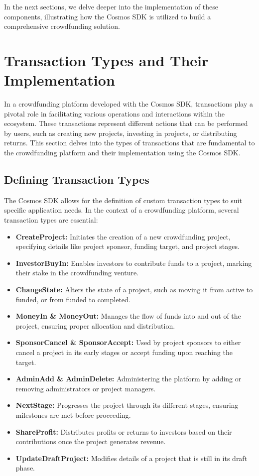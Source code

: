 In the next sections, we delve deeper into the implementation of these components, illustrating how the Cosmos SDK is utilized to build a comprehensive crowdfunding solution.

\section{Transaction Types and Their Implementation}

In a crowdfunding platform developed with the Cosmos SDK, transactions play a pivotal role in facilitating various operations and interactions within the ecosystem. These transactions represent different actions that can be performed by users, such as creating new projects, investing in projects, or distributing returns. This section delves into the types of transactions that are fundamental to the crowdfunding platform and their implementation using the Cosmos SDK.

\subsection{Defining Transaction Types}

The Cosmos SDK allows for the definition of custom transaction types to suit specific application needs. In the context of a crowdfunding platform, several transaction types are essential:

\begin{itemize}
    \item \textbf{CreateProject:} Initiates the creation of a new crowdfunding project, specifying details like project sponsor, funding target, and project stages.
    \item \textbf{InvestorBuyIn:} Enables investors to contribute funds to a project, marking their stake in the crowdfunding venture.
    \item \textbf{ChangeState:} Alters the state of a project, such as moving it from active to funded, or from funded to completed.
    \item \textbf{MoneyIn \& MoneyOut:} Manages the flow of funds into and out of the project, ensuring proper allocation and distribution.
    \item \textbf{SponsorCancel \& SponsorAccept:} Used by project sponsors to either cancel a project in its early stages or accept funding upon reaching the target.
    \item \textbf{AdminAdd \& AdminDelete:} Administering the platform by adding or removing administrators or project managers.
    \item \textbf{NextStage:} Progresses the project through its different stages, ensuring milestones are met before proceeding.
    \item \textbf{ShareProfit:} Distributes profits or returns to investors based on their contributions once the project generates revenue.
    \item \textbf{UpdateDraftProject:} Modifies details of a project that is still in its draft phase.
\end{itemize}

